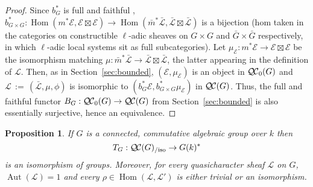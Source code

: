 \documentclass{amsart}
\theoremstyle{plain}
\newtheorem{proposition}[theorem]{Proposition}
\theoremstyle{definition}
\theoremstyle{remark}
\newcommand{\Fq}{k}
\DeclareMathOperator{\Aut}{Aut}
\DeclareMathOperator{\Hom}{Hom}
\newcommand{\ceq}{{\, :=\, }}
\newcommand{\qcs}[1]{{\mathcal{#1}}}
\newcommand{\gqcs}[1]{{\mathcal{\bar #1}}}
\newcommand{\QC}{{\mathcal{Q\hskip-0.8pt C}}}
\newcommand{\bQC}{{\QC_0}}
\newcommand{\QCiso}[1]{\QC(#1)_{/\text{iso}}}
\newcommand{\TrFrob}[1]{T_{#1}}
\begin{document}
\begin{proof}
  Since $b_G^*$ is full and faithful
  ,
  $
  b_{G\times G}^* : \Hom(m^*\qcs{E},\qcs{E}\boxtimes\qcs{E}) \to \Hom({\bar m}^*\gqcs{L},\gqcs{L}\boxtimes\gqcs{L})
  $
  is a bijection
  (hom taken in the categories on constructible $\ell$-adic sheaves on
  $G\times G$ and ${\bar G}\times {\bar G}$ respectively,
  in which $\ell$-adic local systems sit as full subcategories).
  Let $\mu_\qcs{E} : m^*\qcs{E} \to \qcs{E}\boxtimes\qcs{E}$ be the isomorphism matching
  $\mu : {\bar m}^*\gqcs{L} \to \gqcs{L}\boxtimes\gqcs{L}$,
  the latter appearing in the definition of $\qcs{L}$.
  Then, as in Section~\ref{sec:bounded}, $(\qcs{E},\mu_\qcs{E})$ is an object in $\bQC(G)$
  and $\qcs{L} \ceq (\gqcs{L},\mu,\phi)$ is isomorphic to $(b_G^*\qcs{E},b_{G\times G}^*\mu_\qcs{E})$ in $\QC(G)$.
  Thus, the full and faithful functor $B_G : \bQC(G) \to \QC(G)$ from Section~\ref{sec:bounded}
  is also essentially surjective, hence an equivalence.
\end{proof}


\begin{proposition}\label{prop:connected}
 If $G$ is a connected, commutative algebraic group over $\Fq$ then
 \[
  \TrFrob{G} : \QCiso{G} \to G(\Fq)^*
 \]
 is an isomorphism of groups.
 Moreover, for every quasicharacter sheaf $\qcs{L}$ on $G$, $\Aut(\qcs{L}) = 1$
 and every $\rho \in \Hom(\qcs{L},\qcs{L}')$ is either trivial or an isomorphism.
 \end{proposition}
\end{document}
